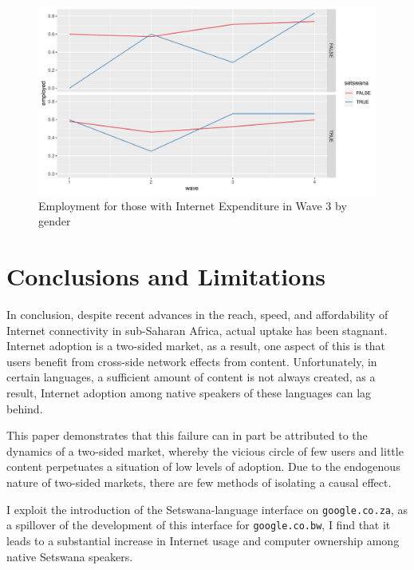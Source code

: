 \documentclass[a4paper,british]{article}\usepackage[]{graphicx}\usepackage[]{xcolor}
\makeatletter
\def\maxwidth{ %
  \ifdim\Gin@nat@width>\linewidth
    \linewidth
  \else
    \Gin@nat@width
  \fi
}
\newenvironment{knitrout}{}{} %
\providecommand*{\code}[1]{\texttt{#1}}
\makeatother
\begin{document}
\begin{figure}[H]
\caption{Employment for those with Internet Expenditure in Wave 3 by gender}

\begin{knitrout}
\color{fgcolor}
\includegraphics[width=\maxwidth]{../misc/latex-gender_employment_int_exp-1} 
\end{knitrout}
\end{figure}


\section{Conclusions and Limitations}

\label{sec:conclusions}In conclusion, despite recent advances in
the reach, speed, and affordability of Internet connectivity in sub-Saharan
Africa, actual uptake has been stagnant. Internet adoption is a two-sided
market, as a result, one aspect of this is that users benefit from
cross-side network effects from content. Unfortunately, in certain
languages, a sufficient amount of content is not always created, as
a result, Internet adoption among native speakers of these languages
can lag behind.

This paper demonstrates that this failure can in part be attributed
to the dynamics of a two-sided market, whereby the vicious circle
of few users and little content perpetuates a situation of low levels
of adoption. Due to the endogenous nature of two-sided markets, there
are few methods of isolating a causal effect.

I exploit the introduction of the Setswana-language interface on \code{google.co.za},
as a spillover of the development of this interface for \code{google.co.bw},
I find that it leads to a substantial increase in Internet usage and
computer ownership among native Setswana speakers.
\end{document}
